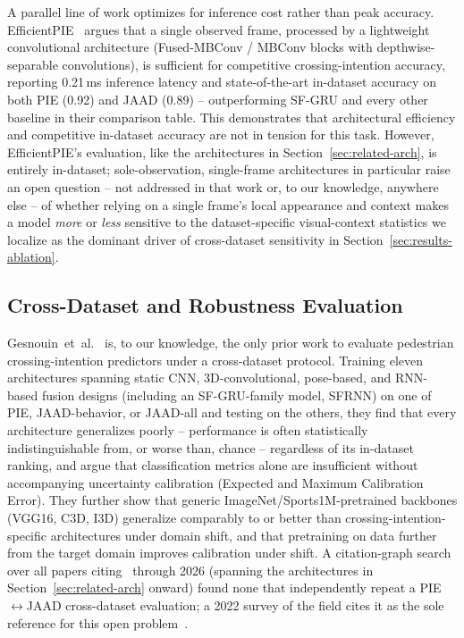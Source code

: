 A parallel line of work optimizes for inference cost rather than
peak accuracy. EfficientPIE~\cite{efficientpie2025} argues that a
single observed frame, processed by a lightweight convolutional
architecture (Fused-MBConv / MBConv blocks with depthwise-separable
convolutions), is sufficient for competitive crossing-intention
accuracy, reporting 0.21\,ms inference latency and state-of-the-art
in-dataset accuracy on both PIE (0.92) and JAAD (0.89) -- outperforming
SF-GRU and every other baseline in their comparison table. This
demonstrates that architectural efficiency and competitive in-dataset
accuracy are not in tension for this task. However, EfficientPIE's
evaluation, like the architectures in
Section~\ref{sec:related-arch}, is entirely in-dataset;
sole-observation, single-frame architectures in particular raise an
open question -- not addressed in that work or, to our knowledge,
anywhere else -- of whether relying on a single frame's local
appearance and context makes a model \emph{more} or \emph{less}
sensitive to the dataset-specific visual-context statistics we
localize as the dominant driver of cross-dataset sensitivity in
Section~\ref{sec:results-ablation}.

\subsection{Cross-Dataset and Robustness Evaluation}
\label{sec:related-robustness}

Gesnouin~et~al.~\cite{gesnouin2022} is, to our knowledge, the only prior
work to evaluate pedestrian crossing-intention predictors under a
cross-dataset protocol. Training eleven architectures spanning static
CNN, 3D-convolutional, pose-based, and RNN-based fusion designs
(including an SF-GRU-family model, SFRNN) on one of PIE, JAAD-behavior,
or JAAD-all and testing on the others, they find that every architecture
generalizes poorly -- performance is often statistically
indistinguishable from, or worse than, chance -- regardless of its
in-dataset ranking, and argue that classification metrics alone are
insufficient without accompanying uncertainty calibration (Expected and
Maximum Calibration Error). They further show that generic
ImageNet/Sports1M-pretrained backbones (VGG16, C3D, I3D) generalize
comparably to or better than crossing-intention-specific architectures
under domain shift, and that pretraining on data further from the target
domain improves calibration under shift. A citation-graph search over
all papers citing~\cite{gesnouin2022} through 2026 (spanning the
architectures in Section~\ref{sec:related-arch} onward) found none that
independently repeat a PIE$\leftrightarrow$JAAD cross-dataset
evaluation; a 2022 survey of the field cites it as the sole reference
for this open problem~\cite{fang2022survey}.

